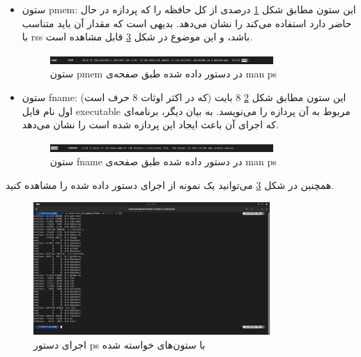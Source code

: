 \documentclass[12pt]{article}
\begin{document}
\begin{itemize}
        \item ستون \textenglish{pmem}:
        این ستون مطابق شکل 
        \ref{im5}
        درصدی از کل حافظه را که پردازه در حال حاضر دارد استفاده می‌کند را نشان می‌دهد. بدیهی است که مقدار آن باید متناسب با 
        \textenglish{rss}
        باشد، و این موضوع در شکل
        \ref{im7}
        قابل مشاهده است.

        \begin{figure}[H]
		\centering
		\includegraphics[width=0.8\textwidth]{report6-resources/5.png}
		\caption{ستون \textenglish{pmem} در دستور داده شده طبق صفحه‌ی \textenglish{man ps}}
            \label{im5}
	\end{figure}

        \item ستون \textenglish{fname}:
        این ستون مطابق شکل 
        \ref{im6}
        \textenglish{8}
        بایت (که در اکثر اوثات 
        \textenglish{8}
        حرف است) اول نام فایل
        \textenglish{executable}
        مربوط به آن پردازه را می‌نویسد. به بیان دیگر، برنامه‌ای که اجرای آن باعث ایجاد این پردازه شده است را نشان می‌دهد.


        \begin{figure}[H]
		\centering
		\includegraphics[width=0.8\textwidth]{report6-resources/6.png}
		\caption{ستون \textenglish{fname} در دستور داده شده طبق صفحه‌ی \textenglish{man ps}}
            \label{im6}
	\end{figure}

        \end{itemize}

        همچنین در شکل
        \ref{im7}
        می‌توانید یک نمونه از اجرای دستور داده شده را مشاهده کنید.

        \begin{figure}[H]
		\centering
		\includegraphics[width=0.8\textwidth]{report6-resources/7.png}
		\caption{اجرای دستور \textenglish{ps} با ستون‌های خواسته شده}
            \label{im7}
	\end{figure}
\end{document}
